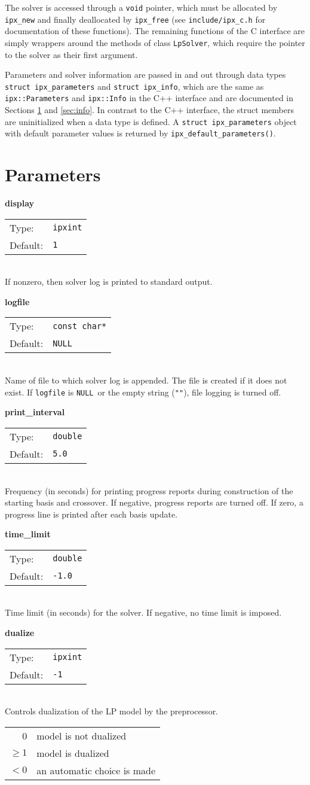 \documentclass{article}
\makeatletter
\newcommand{\ct}{\texttt}
\newcommand{\NULL}{\ct{NULL}}
\newcommand{\param}[4]{
  \noindent\textbf{#1}\\
  \begin{tabular}{@{\hskip 0pt}ll}
    Type: & \ct{#2} \\
    Default: & \ct{#3}
  \end{tabular}\\
  #4 \vskip 1\baselineskip
}
\makeatother
\begin{document}
The solver is accessed through a \ct{void} pointer, which must be allocated by
\ct{ipx\_new} and finally deallocated by \ct{ipx\_free} (see
\ct{include/ipx\_c.h} for documentation of these functions). The remaining
functions of the C interface are simply wrappers around the methods of class
\ct{LpSolver}, which require the pointer to the solver as their first argument.

Parameters and solver information are passed in and out through data types
\ct{struct ipx\_parameters} and \ct{struct ipx\_info}, which are the same as
\ct{ipx::Parameters} and \ct{ipx::Info} in the C++ interface and are documented
in Sections \ref{sec:parameters} and \ref{sec:info}. In contrast to the C++
interface, the struct members are uninitialized when a data type is defined.
A \ct{struct ipx\_parameters} object with default parameter values is returned
by \ct{ipx\_default\_parameters()}.

\section{Parameters}
\label{sec:parameters}

\param{display}{ipxint}{1}{
  If nonzero, then solver log is printed to standard output.
}

\param{logfile}{const char*}{\NULL}{
  Name of file to which solver log is appended. The file is created if it does
  not exist. If \ct{logfile} is \NULL\ or the empty string (\ct{""}), file
  logging is turned off.
}

\param{print\_interval}{double}{5.0}{
  Frequency (in seconds) for printing progress reports during construction of
  the starting basis and crossover. If negative, progress reports are turned
  off. If zero, a progress line is printed after each basis update.
}

\param{time\_limit}{double}{-1.0}{
  Time limit (in seconds) for the solver. If negative, no time limit is
  imposed.
}

\param{dualize}{ipxint}{-1}{
  Controls dualization of the LP model by the preprocessor. \\
  \begin{tabular}{rl}
    0 & model is not dualized \\
    $\ge1$ & model is dualized \\
    $<0$ & an automatic choice is made
  \end{tabular}
}
\end{document}
